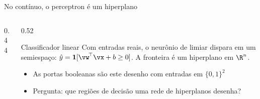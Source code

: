 \documentclass[aspectratio=169, 11pt]{beamer}
\begin{document}
\begin{frame}{No contínuo, o perceptron é um hiperplano}

  \begin{columns}[T]
    \begin{column}{0.44\textwidth}
      \begin{center}
      \end{center}
    \end{column}
    \begin{column}{0.52\textwidth}
      \begin{defbox}{Classificador linear}
        Com entradas reais, o neurônio de limiar dispara em um semiespaço:
        $\hat{y} = \mathbf{1}[\vw^{\!\top}\vx + b \ge 0]$. A fronteira é um
        hiperplano em $\R^n$.
      \end{defbox}

      \smallskip
      \begin{itemize}\setlength{\itemsep}{0.2ex}
        \item As portas booleanas são este desenho com entradas em
              $\{0,1\}^2$
        \item Pergunta: que regiões de decisão uma rede de hiperplanos
              desenha?
      \end{itemize}
    \end{column}
  \end{columns}
\end{frame}
\end{document}
